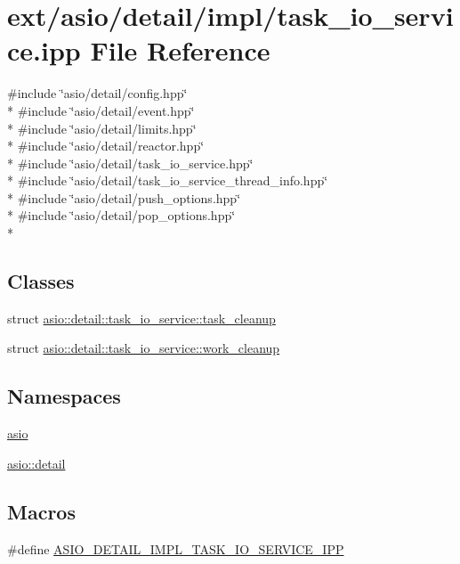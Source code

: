 \hypertarget{task__io__service_8ipp}{}\section{ext/asio/detail/impl/task\+\_\+io\+\_\+service.ipp File Reference}
\label{task__io__service_8ipp}
{\ttfamily \#include \char`\"{}asio/detail/config.\+hpp\char`\"{}}\\*
{\ttfamily \#include \char`\"{}asio/detail/event.\+hpp\char`\"{}}\\*
{\ttfamily \#include \char`\"{}asio/detail/limits.\+hpp\char`\"{}}\\*
{\ttfamily \#include \char`\"{}asio/detail/reactor.\+hpp\char`\"{}}\\*
{\ttfamily \#include \char`\"{}asio/detail/task\+\_\+io\+\_\+service.\+hpp\char`\"{}}\\*
{\ttfamily \#include \char`\"{}asio/detail/task\+\_\+io\+\_\+service\+\_\+thread\+\_\+info.\+hpp\char`\"{}}\\*
{\ttfamily \#include \char`\"{}asio/detail/push\+\_\+options.\+hpp\char`\"{}}\\*
{\ttfamily \#include \char`\"{}asio/detail/pop\+\_\+options.\+hpp\char`\"{}}\\*
\subsection*{Classes}
\begin{DoxyCompactItemize}
\item 
struct \hyperlink{structasio_1_1detail_1_1task__io__service_1_1task__cleanup}{asio\+::detail\+::task\+\_\+io\+\_\+service\+::task\+\_\+cleanup}
\item 
struct \hyperlink{structasio_1_1detail_1_1task__io__service_1_1work__cleanup}{asio\+::detail\+::task\+\_\+io\+\_\+service\+::work\+\_\+cleanup}
\end{DoxyCompactItemize}
\subsection*{Namespaces}
\begin{DoxyCompactItemize}
\item 
 \hyperlink{namespaceasio}{asio}
\item 
 \hyperlink{namespaceasio_1_1detail}{asio\+::detail}
\end{DoxyCompactItemize}
\subsection*{Macros}
\begin{DoxyCompactItemize}
\item 
\#define \hyperlink{task__io__service_8ipp_a7c1fc81f43742491779bf97ba8098eba}{A\+S\+I\+O\+\_\+\+D\+E\+T\+A\+I\+L\+\_\+\+I\+M\+P\+L\+\_\+\+T\+A\+S\+K\+\_\+\+I\+O\+\_\+\+S\+E\+R\+V\+I\+C\+E\+\_\+\+I\+P\+P}
\end{DoxyCompactItemize}


